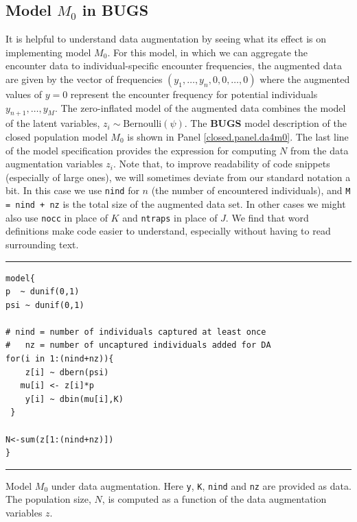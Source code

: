 \subsection{Model $M_0$ in BUGS}

It is helpful to understand data augmentation by seeing what its
effect is on implementing model $M_0$. For this model,
 in which we can aggregate the encounter data to
individual-specific encounter frequencies, the augmented data are
given by the vector of frequencies $(y_{1}, \ldots, y_{n}, 0, 0,
\ldots, 0)$ where the augmented values of $y=0$ represent the encounter
frequency  for potential individuals $y_{n+1},\ldots,y_{M}$.
The zero-inflated model of the augmented data combines
the model of the latent variables, $z_{i} \sim
\mbox{Bernoulli}(\psi)$.
The {\bf BUGS} model description of the
closed population model $M_0$ is 
shown in Panel \ref{closed.panel.da4m0}.
 The last line of the model
specification  provides the expression for computing $N$ from the
data augmentation variables $z_{i}$. Note that, to improve readability of code
snippets (especially of large ones), we will sometimes deviate from our
standard notation a bit. In this case we use \mbox{\tt nind} for $n$
(the number of encountered individuals), and \mbox{\tt M = nind + nz}
is the total size of the augmented data set. In other cases we might
also use \mbox{\tt nocc} in place of $K$ and \mbox{\tt ntraps} in
place of $J$. We find that word definitions make code easier to
understand, especially without having to read surrounding text.

\begin{panel}[ht]
\centering
\rule[0.15in]{\textwidth}{.03in}
{\small
\begin{verbatim}
model{
p  ~ dunif(0,1)
psi ~ dunif(0,1)

# nind = number of individuals captured at least once
#   nz = number of uncaptured individuals added for DA
for(i in 1:(nind+nz)){
    z[i] ~ dbern(psi)
   mu[i] <- z[i]*p
    y[i] ~ dbin(mu[i],K)
 }

N<-sum(z[1:(nind+nz)])
}
\end{verbatim}
}
\rule[-0.15in]{\textwidth}{.03in}
\caption{Model $M_{0}$ under data augmentation. Here \mbox{\tt y},
  \mbox{\tt K}, \mbox{\tt nind} and \mbox{\tt nz} are provided as
  data. The population size, $N$, is computed as a function of
the data augmentation variables $z$. }
\label{closed.panel.da4m0}
\end{panel}





